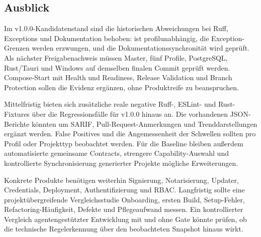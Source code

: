 \subsection{Ausblick}
\label{subsec:ausblick}

Im v1.0.0-Kandidatenstand sind die historischen Abweichungen bei Ruff, Exceptions
und Dokumentation behoben:  ist profilunabhängig, die
Exception-Grenzen werden erzwungen, und die Dokumentationssynchronität wird
geprüft. Als nächster Freigabenachweis müssen Master, fünf Profile, PostgreSQL,
Rust/Tauri und Windows auf demselben finalen Commit geprüft werden.
Compose-Start mit Health und Readiness, Release Validation und Branch
Protection sollen die Evidenz ergänzen, ohne Produktreife zu beanspruchen.

Mittelfristig bieten sich zusätzliche reale negative Ruff-, ESLint- und
Rust-Fixtures über die Regressionsfälle für v1.0.0 hinaus an. Die vorhandenen
JSON-Berichte könnten um SARIF, Pull-Request-Anmerkungen und Trenddarstellungen
ergänzt werden. False Positives und die Angemessenheit der Schwellen sollten pro
Profil oder Projekttyp beobachtet werden. Für die Baseline bleiben außerdem
automatisierte gemeinsame Contracts, strengere Capability-Auswahl und
kontrollierte Synchronisierung generierter Projekte mögliche Erweiterungen.

Konkrete Produkte benötigen weiterhin Signierung, Notarisierung, Updater,
Credentials, Deployment, Authentifizierung und RBAC. Langfristig sollte eine
projektübergreifende Vergleichsstudie Onboarding, ersten Build, Setup-Fehler,
Refactoring-Häufigkeit, Defekte und Pflegeaufwand messen. Ein kontrollierter
Vergleich agentengestützter Entwicklung mit und ohne Gate könnte prüfen, ob die
technische Regelerkennung über den beobachteten Snapshot hinaus wirkt.
